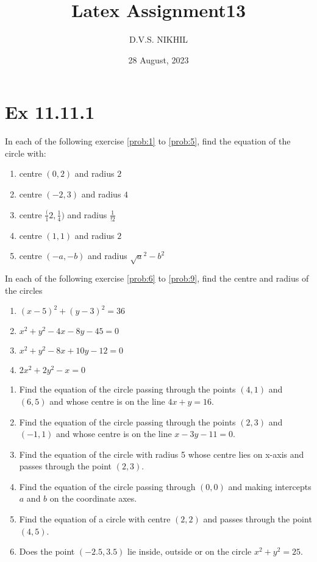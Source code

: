 \documentclass{article}
\theoremstyle{remark}
\begin{document}
\title{Latex Assignment13}
\author{D.V.S. NIKHIL}
\date{28 August, 2023}
\maketitle
\section*{Ex 11.11.1}
In each of the following exercise \ref{prob:1} to \ref{prob:5}, find the equation of the circle with:
\begin{enumerate}[label=\arabic*.,ref=\thesubsection.\theenumi]
\item centre $(0,2)$ and radius $2$ \label{prob:1}
\item centre $(-2,3)$ and radius $4$
\item centre $\frac({1}{2},\frac{1}{4})$ and radius $\frac {1}{!2}$
\item centre $(1,1)$ and radius $2$
\item centre $(-a,-b)$ and radius $\sqrt a^2-b^2$ \label{prob:5}
\end{enumerate}
In each of the following exercise \ref{prob:6} to \ref{prob:9}, find the centre and radius of the circles
\begin{enumerate}[resume]
\item $(x-5)^2+(y-3)^2=36$ \label{prob:6}
\item $x^2+y^2-4x-8y-45=0$
\item $x^2+y^2-8x+10y-12=0$
\item $2x^2+2y^2-x=0$ \label{prob:9}
\end{enumerate}
\begin{enumerate}[resume]
\item Find the equation of the circle passing through the points $(4,1)$ and $(6,5)$ and whose centre is on the line $4x+y=16$.
\item Find the equation of the circle passing through the points $(2,3)$ and $(-1,1)$ and whose centre is on the line $x-3y-11=0$.
\item Find the equation of the circle with radius 5 whose centre lies on x-axis and passes through the point $(2,3)$.
\item Find the equation of the circle passing through $(0,0)$ and making intercepts $a$ and $b$ on the coordinate axes.
\item Find the equation of a circle with centre $(2,2)$ and passes through the point $(4,5)$.
\item Does the point $(-2.5,3.5)$ lie inside, outside or on the circle $x^2+y^2=25$.
\end{enumerate}
\end{document}
